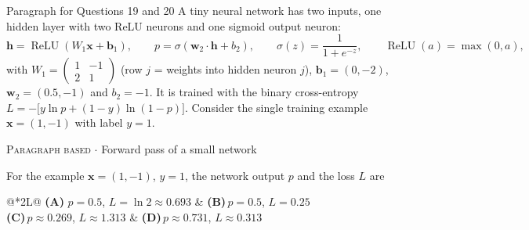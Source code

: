\documentclass[11pt,a4paper]{article}
\newcommand{\optlabel}[1]{\textbf{(#1)}}
\newcommand{\correctlabel}[1]{\textcolor{okgreen}{\textbf{(#1)}\,\ding{51}}}
\newenvironment{qitem}[1]{\begin{list}{}{\setlength{\leftmargin}{3.3em}\setlength{\labelwidth}{3.1em}%
  \setlength{\labelsep}{0.2em}\setlength{\topsep}{3pt}\setlength{\parsep}{3pt}}\item[\textbf{Q.#1}\hfill]}{\end{list}}
\newcommand{\qmeta}[2]{{\footnotesize\color{black!60}\textsc{#1} \;$\cdot$\; #2}\par}
\begin{document}
\begin{passagebox}{Paragraph for Questions 19 and 20}
A tiny neural network has two inputs, one hidden layer with two ReLU neurons and one sigmoid output neuron:
\[ \mathbf h = \operatorname{ReLU}(W_1\mathbf x + \mathbf b_1),\qquad p = \sigma(\mathbf w_2\cdot\mathbf h + b_2),\qquad
   \sigma(z) = \frac{1}{1 + e^{-z}},\qquad \operatorname{ReLU}(a) = \max(0, a), \]
with $W_1 = \begin{pmatrix}1 & -1\\ 2 & 1\end{pmatrix}$ (row $j$ = weights into hidden neuron $j$), $\mathbf b_1 = (0, -2)$,
$\mathbf w_2 = (0.5, -1)$ and $b_2 = -1$. It is trained with the binary cross-entropy
$L = -\big[y\ln p + (1-y)\ln(1-p)\big]$. Consider the single training example $\mathbf x = (1, -1)$ with label $y = 1$.
\end{passagebox}
\begin{qitem}{19}
\qmeta{Paragraph based}{Forward pass of a small network}
For the example $\mathbf x = (1, -1)$, $y = 1$, the network output $p$ and the loss $L$ are
\par\smallskip\noindent\begin{tabularx}{\linewidth}{@{}*{2}{L}@{}}
\correctlabel{A}\,$p = 0.5$, $L = \ln 2 \approx 0.693$ & \optlabel{B}\,$p = 0.5$, $L = 0.25$ \\[3pt]
\optlabel{C}\,$p \approx 0.269$, $L \approx 1.313$ & \optlabel{D}\,$p \approx 0.731$, $L \approx 0.313$
\end{tabularx}
\end{qitem}
\end{document}

